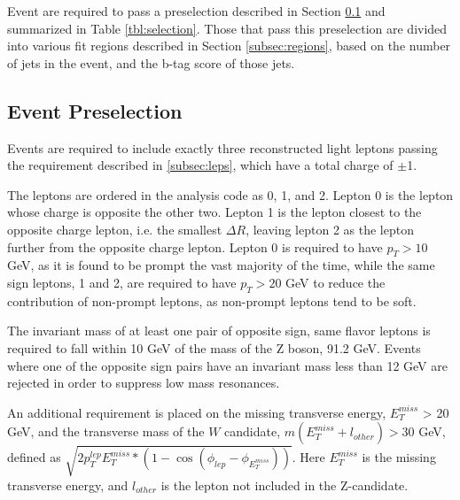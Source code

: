 
Event are required to pass a preselection described in Section \ref{subsec:presel} and summarized in Table \ref{tbl:selection}. Those that pass this preselection are divided into various fit regions described in Section \ref{subsec:regions}, based on the number of jets in the event, and the b-tag score of those jets.

\subsection{Event Preselection}
\label{subsec:presel}

Events are required to include exactly three reconstructed light leptons passing the requirement described in \ref{subsec:leps}, which have a total charge of $\pm$1. %

The leptons are ordered in the analysis code as 0, 1, and 2. Lepton 0 is the lepton whose charge is opposite the other two. Lepton 1 is the lepton closest to the opposite charge lepton, i.e. the smallest $\Delta R$, leaving lepton 2 as the lepton further from the opposite charge lepton. Lepton 0 is required to have $p_T > 10$ GeV, as it is found to be prompt the vast majority of the time, while the same sign leptons, 1 and 2, are required to have $p_T > 20$ GeV to reduce the contribution of non-prompt leptons, as non-prompt leptons tend to be soft.  

The invariant mass of at least one pair of opposite sign, same flavor leptons is required to fall within 10 GeV of the mass of the Z boson, 91.2 GeV. Events where one of the opposite sign pairs have an invariant mass less than 12 GeV are rejected in order to suppress low mass resonances. %

An additional requirement is placed on the missing transverse energy, $E^{miss}_T$ > 20 GeV, and the transverse mass of the $W$ candidate, $m(E^{miss}_T + l_{other}) > 30$ GeV, defined as $\sqrt{2p_T^{lep}E^{miss}_T*(1-\cos(\phi_{lep}-\phi_{E^{miss}_T}))}$. Here $E^{miss}_T$ is the missing transverse energy, and $l_{other}$ is the lepton not included in the Z-candidate. 

